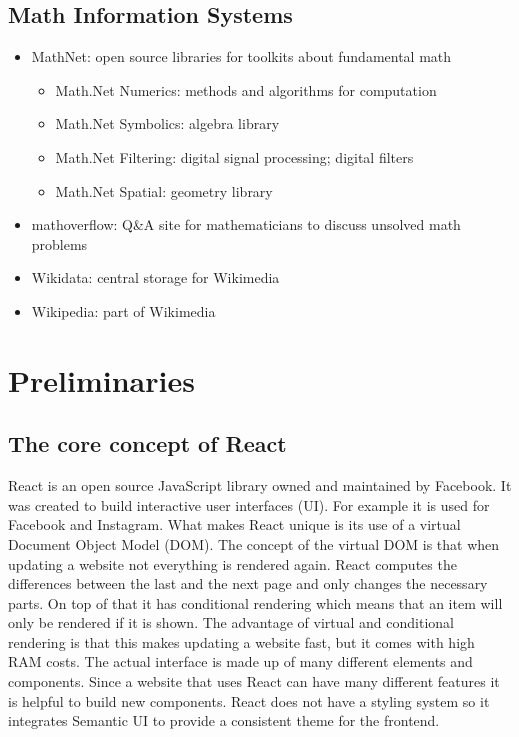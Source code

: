 \documentclass[11pt,a4paper]{article}
\begin{document}
\subsection{Math Information Systems}
\begin{itemize}
\item MathNet: open source libraries for toolkits about fundamental math \cite{mathnet}
	\begin{itemize}
	\item Math.Net Numerics: methods and algorithms for computation
	\item Math.Net Symbolics: algebra library
	\item Math.Net Filtering: digital signal processing; digital filters
	\item Math.Net Spatial: geometry library
	\end{itemize}
\item mathoverflow: Q{\&}A site for mathematicians to discuss unsolved math problems
\item Wikidata: central storage for Wikimedia
\item Wikipedia: part of Wikimedia
\end{itemize}

\section{Preliminaries} \label{preliminaries}
\subsection{The core concept of React} 
React is an open source JavaScript library owned and maintained by Facebook.	It was created to build interactive user interfaces (UI).
For example it is used for Facebook and Instagram.
What makes React unique is its use of a virtual Document Object Model (DOM).
The concept of the virtual DOM is that when updating a website not everything is rendered again.
React computes the differences between the last and the next page and only changes the necessary parts.
On top of that it has conditional rendering which means that an item will only be rendered if it is shown.
The advantage of virtual and conditional rendering is that this makes updating a website fast, but it comes with high RAM costs.
The actual interface is made up of many different elements and components.
Since a website that uses React can have many different features it is helpful to build new components.
\cite{reactjs}
React does not have a styling system so it integrates Semantic UI to provide a consistent theme for the frontend.
\end{document}
